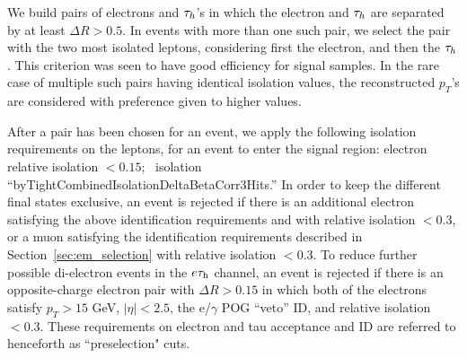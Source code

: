 We build pairs of electrons and $\tau_h$'s in which the electron and
$\tau_h$ are separated by at least $\Delta R > 0.5$.  In events with
more than one such pair, we select the pair with the two most isolated
leptons, considering first the electron, and then the $\tau_h$.  This
criterion was seen to have good efficiency for signal samples.  In the
rare case of multiple such pairs having identical isolation values,
the reconstructed $p_T$'s are considered with preference given to higher values.


After a pair has been chosen for an event, we apply the following
isolation requirements on the leptons, for an event to enter the
signal region: electron relative isolation $<0.15$; \tauh ~isolation
``byTightCombinedIsolationDeltaBetaCorr3Hits.''  In order to keep the
different final states exclusive, an event is rejected if there is an
additional electron satisfying the above identification requirements
and with relative isolation $<0.3$, or a muon satisfying the
identification requirements described in
Section~\ref{sec:em_selection} with relative isolation $<0.3$.  To
reduce further possible di-electron events in the $e\tau_{\textrm{h}}$ channel, an
event is rejected if there is an opposite-charge electron pair with
$\Delta R > 0.15$ in which both of the electrons satisfy $p_T >
15$ GeV, $\vert \eta \vert < 2.5$, the e/$\gamma$ POG ``veto'' ID,
and relative isolation $<0.3$. These requirements on electron and tau acceptance and ID are referred to henceforth as ``preselection" cuts.

